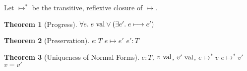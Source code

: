 \documentclass[10pt]{article}
\newtheorem{theorem}{Theorem}
\newcommand{\reduces}{\ensuremath{\longmapsto}}
\newcommand{\reducestr}{\ensuremath{\longmapsto^{*}}}
\newcommand{\val}{\textnormal{ val}}
\begin{document}
Let $\reducestr$ be the transitive, reflexive closure of $\reduces$.

\begin{theorem}[Progress]
  $\forall e.\; e \val \lor (\exists e'.\; e \reduces e')$
\end{theorem}

\begin{theorem}[Preservation]
   $e : T$  $e \reduces e'$  $e' : T$
\end{theorem}

\begin{theorem}[Uniqueness of Normal Forms]
   $e : T$, $v \val$, $v' \val$, $e \reducestr v$  $e \reducestr v'$  $v = v'$
\end{theorem}
\end{document}
